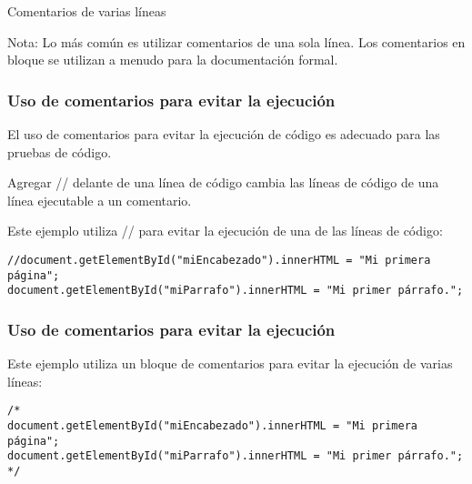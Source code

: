 \begin{frame}[c]{Comentarios de varias líneas}
  \begin{block}{Nota:}
    Lo más común es utilizar comentarios de una sola línea.
    Los comentarios en bloque se utilizan a menudo para la
    documentación formal.
  \end{block}
\end{frame}

\begin{frame}[fragile]
  \frametitle{Uso de comentarios para evitar la ejecución}

  El uso de comentarios para evitar la ejecución de código es
  adecuado para las pruebas de código.

  \vspace{\baselineskip}
  Agregar // delante de una línea de código cambia las líneas de
  código de una línea ejecutable a un comentario.

  \vspace{\baselineskip}
  Este ejemplo utiliza // para evitar la ejecución de una de las
  líneas de código:

  \vspace{\baselineskip}
  \begin{lstlisting}
//document.getElementById("miEncabezado").innerHTML = "Mi primera página";
document.getElementById("miParrafo").innerHTML = "Mi primer párrafo.";
  \end{lstlisting}
\end{frame}

\begin{frame}[fragile]
  \frametitle{Uso de comentarios para evitar la ejecución}

  Este ejemplo utiliza un bloque de comentarios para evitar
  la ejecución de varias líneas:

  \vspace{\baselineskip}
  \begin{lstlisting}
/*
document.getElementById("miEncabezado").innerHTML = "Mi primera página";
document.getElementById("miParrafo").innerHTML = "Mi primer párrafo.";
*/
  \end{lstlisting}
\end{frame}
